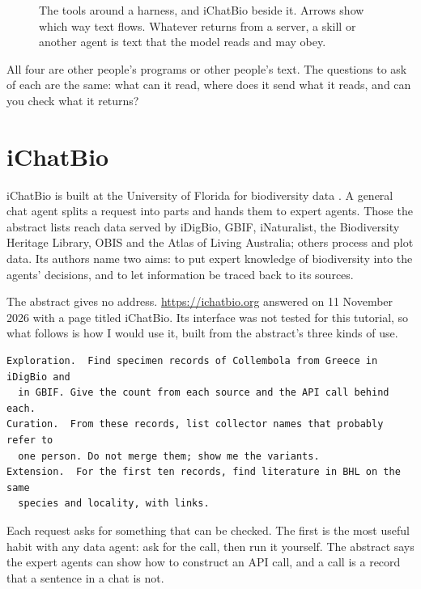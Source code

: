 \documentclass[11pt,a4paper]{article}
\begin{document}
\begin{figure}[htbp]
\centering
{}
\caption{The tools around a harness, and iChatBio beside it. Arrows show
which way text flows. Whatever returns from a server, a skill or another
agent is text that the model reads and may obey.}
\label{fig:tools}
\end{figure}

All four are other people's programs or other people's text. The questions to
ask of each are the same: what can it read, where does it send what it reads,
and can you check what it returns?

\section{iChatBio}
\label{sec:ichatbio}

iChatBio is built at the University of Florida for biodiversity data
\parencite{elliott2025ichatbio}. A general chat agent splits a request into
parts and hands them to expert agents. Those the abstract lists reach data
served by iDigBio, GBIF, iNaturalist, the Biodiversity Heritage Library, OBIS
and the Atlas of Living Australia; others process and plot data. Its authors
name two aims: to put expert knowledge of biodiversity into the agents'
decisions, and to let information be traced back to its sources.

The abstract gives no address. \url{https://ichatbio.org} answered on
11 November 2026 with a page titled iChatBio. Its interface was not tested
for this tutorial, so what follows is how I would use it, built from the
abstract's three kinds of use.

\begin{lstlisting}[caption={Three requests, one per kind of use}]
Exploration.  Find specimen records of Collembola from Greece in iDigBio and
  in GBIF. Give the count from each source and the API call behind each.
Curation.  From these records, list collector names that probably refer to
  one person. Do not merge them; show me the variants.
Extension.  For the first ten records, find literature in BHL on the same
  species and locality, with links.
\end{lstlisting}

Each request asks for something that can be checked. The first is the most
useful habit with any data agent: ask for the call, then run it yourself. The
abstract says the expert agents can show how to construct an API call, and a
call is a record that a sentence in a chat is not.
\end{document}
